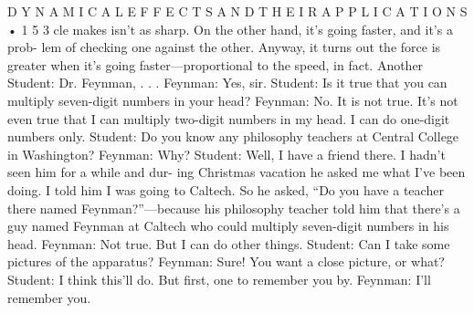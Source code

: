 \documentclass[10pt,oneside]{article}
\begin{document}
D Y N A M I C A L  E F F E C T S  A N D  T H E I R  A P P L I C A T I O N S • 1 5 3 cle makes isn’t as sharp. On the other hand, it’s going faster, and it’s a prob- lem of checking one against the other. Anyway, it turns out the force is greater when it’s going faster---proportional to the speed, in fact. Another Student: Dr. Feynman, . . . Feynman: Yes, sir. Student: Is it true that you can multiply seven-digit numbers in your head? Feynman: No. It is not true. It’s not even true that I can multiply two-digit numbers in my head. I can do one-digit numbers only. Student: Do you know any philosophy teachers at Central College in Washington? Feynman: Why? Student: Well, I have a friend there. I hadn’t seen him for a while and dur- ing Christmas vacation he asked me what I’ve been doing. I told him I was going to Caltech. So he asked, “Do you have a teacher there named Feynman?”---because his philosophy teacher told him that there’s a guy named Feynman at Caltech who could multiply seven-digit numbers in his head. Feynman: Not true. But I can do other things. Student: Can I take some pictures of the apparatus? Feynman: Sure! You want a close picture, or what? Student: I think this’ll do. But first, one to remember you by. Feynman: I’ll remember you.\par

\clearpage
{}
\end{document}
